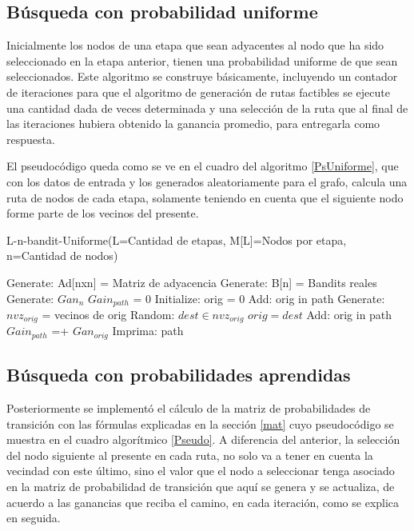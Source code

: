 \subsection{Búsqueda con probabilidad uniforme}

Inicialmente los nodos de una etapa que sean adyacentes al nodo que ha sido seleccionado en la etapa anterior, tienen una probabilidad uniforme de que sean seleccionados. Este algoritmo se construye básicamente, incluyendo un contador de iteraciones para que el algoritmo de generación de rutas factibles se ejecute una cantidad dada de veces determinada y una selección de la ruta que al final de las iteraciones hubiera obtenido la ganancia promedio, para entregarla como respuesta. 

El pseudocódigo queda como se ve en el cuadro del algoritmo \ref{PsUniforme}, que con los datos de entrada y los generados aleatoriamente para el grafo, calcula una ruta de nodos de cada etapa, solamente teniendo en cuenta que el siguiente nodo forme parte de los vecinos del presente.

\begin{algorithm} [h]
\caption{L-n-bandit-Uniforme(L=Cantidad de etapas, M[L]=Nodos por etapa,
n=Cantidad de nodos)} \label{PsUniforme}
\begin{algorithmic}[1]
\STATE Generate: Ad[nxn] = Matriz de adyacencia
\STATE Generate: B[n] = Bandits reales
    \STATE Generate: $Gan_{n}$
    \STATE $Gain_{path}$ = 0
    \STATE Initialize: orig = 0
    \STATE Add: orig in path
        \STATE Generate: $nvz_{orig}$ = vecinos de orig
        \STATE Random: ${dest \in nvz_{orig}}$
        \STATE $orig = dest$
        \STATE Add: orig in path
        \STATE $Gain_{path}$ =+ $Gan_{orig}$
     \ENDFOR
     \STATE Imprima: path
\ENDFOR
\end{algorithmic}
\end{algorithm}

\subsection{Búsqueda con probabilidades aprendidas}
Posteriormente se implementó el cálculo de la matriz de probabilidades de transición con las fórmulas explicadas en la sección \ref{mat} cuyo pseudocódigo se muestra en el cuadro algorítmico \ref{Pseudo}. A diferencia del anterior, la selección del nodo siguiente al presente en cada ruta, no solo va a tener en cuenta la vecindad con este último, sino el valor que el nodo a seleccionar tenga asociado en la matriz de probabilidad de transición que aquí se genera y se actualiza, de acuerdo a las ganancias que reciba el camino, en cada iteración, como se explica en seguida.

